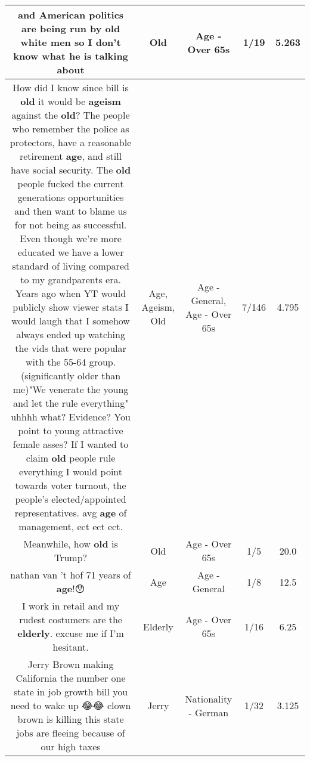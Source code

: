 \documentclass[11pt]{article}
\newlength\mylength
\begin{document}
\begin{center}
\begin{longtable}{|C{.65\mylength}|C{.30\mylength}|C{.12\mylength}|C{.12\mylength}|C{.12\mylength}|}
  \small and American politics are being run by \textbf{old} white men so I don't know what he is  talking about\normalsize   & Old & Age - Over 65s & 1/19 & 5.263 \\  \hline
  \small How did I know since bill is \textbf{old} it would be \textbf{ageism} against the \textbf{old}? The people who remember the police as protectors, have a reasonable retirement \textbf{age}, and still have social security. The \textbf{old} people fucked the current generations opportunities and then want to blame us for not being as successful. Even though we're more educated we have a lower standard of living compared to my grandparents era.  Years ago when YT would publicly show viewer stats I would laugh that I somehow always ended up watching the vids that were popular with the 55-64 group. (significantly older than me)"We venerate the young and let the rule everything" uhhhh what? Evidence? You point to young attractive female asses? If I wanted to claim \textbf{old} people rule everything I would point towards voter turnout, the people's elected/appointed representatives. avg \textbf{age} of management, ect ect ect.\normalsize   & Age, Ageism, Old & Age - General, Age - Over 65s & 7/146 & 4.795 \\  \hline
  \small Meanwhile, how \textbf{old} is Trump?\normalsize   & Old & Age - Over 65s & 1/5 & 20.0 \\  \hline
  \small nathan van 't hof 71 years of \textbf{age}!😯\normalsize   & Age & Age - General & 1/8 & 12.5 \\  \hline
  \small I work in retail and my rudest costumers are the \textbf{elderly}. excuse me if I'm hesitant.\normalsize   & Elderly & Age - Over 65s & 1/16 & 6.25 \\  \hline
  \small Jerry Brown making California the number one state in job growth bill you need to wake up 😂😂 clown brown is killing this state jobs are fleeing because of our high taxes\normalsize   & Jerry & Nationality - German & 1/32 & 3.125 \\  \hline

\end{longtable}
\end{center}
\end{document}
